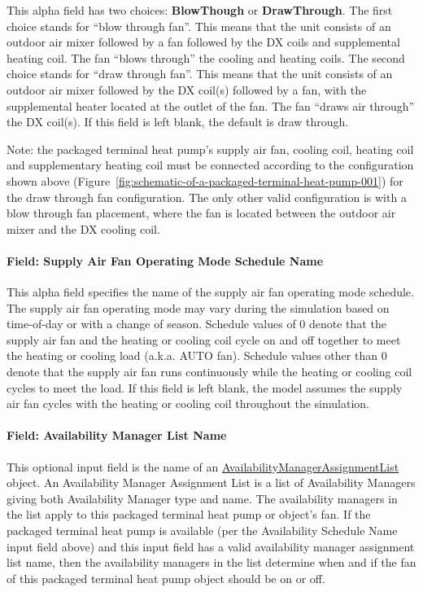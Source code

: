 This alpha field has two choices: \textbf{BlowThough} or \textbf{DrawThrough}. The first choice stands for ``blow through fan''. This means that the unit consists of an outdoor air mixer followed by a fan followed by the DX coils and supplemental heating coil. The fan ``blows through'' the cooling and heating coils. The second choice stands for ``draw through fan''. This means that the unit consists of an outdoor air mixer followed by the DX coil(s) followed by a fan, with the supplemental heater located at the outlet of the fan. The fan ``draws air through'' the DX coil(s). If this field is left blank, the default is draw through.

Note: the packaged terminal heat pump's supply air fan, cooling coil, heating coil and supplementary heating coil must be connected according to the configuration shown above (Figure~\ref{fig:schematic-of-a-packaged-terminal-heat-pump-001}) for the draw through fan configuration. The only other valid configuration is with a blow through fan placement, where the fan is located between the outdoor air mixer and the DX cooling coil.

\paragraph{Field: Supply Air Fan Operating Mode Schedule Name}\label{field-supply-air-fan-operating-mode-schedule-name-5}

This alpha field specifies the name of the supply air fan operating mode schedule. The supply air fan operating mode may vary during the simulation based on time-of-day or with a change of season. Schedule values of 0 denote that the supply air fan and the heating or cooling coil cycle on and off together to meet the heating or cooling load (a.k.a. AUTO fan). Schedule values other than 0 denote that the supply air fan runs continuously while the heating or cooling coil cycles to meet the load. If this field is left blank, the model assumes the supply air fan cycles with the heating or cooling coil throughout the simulation.

\paragraph{Field: Availability Manager List Name}\label{field-availability-manager-list-name-7}

This optional input field is the name of an \hyperref[availabilitymanagerassignmentlist]{AvailabilityManagerAssignmentList} object. An Availability Manager Assignment List is a list of Availability Managers giving both Availability Manager type and name. The availability managers in the list apply to this packaged terminal heat pump or object's fan. If the packaged terminal heat pump is available (per the Availability Schedule Name input field above) and this input field has a valid availability manager assignment list name, then the availability managers in the list determine when and if the fan of this packaged terminal heat pump object should be on or off.

